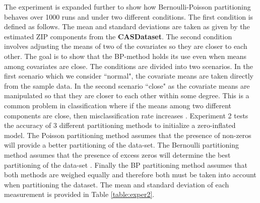 \documentclass[11pt,letterpaper]{article}
\numberwithin{equation}{section}
\numberwithin{equation}{section}
\numberwithin{equation}{section}
\begin{document}
The experiment is expanded further to show how Bernoulli-Poisson partitioning behaves over 1000 runs and under two different conditions. The first condition is defined as follows. The mean and standard deviations are taken as given by the estimated  ZIP components from the \textbf{CASDataset}. The second condition involves adjusting the means of two of the covariates so they are closer to each other. The goal is to show that the BP-method holds its use even when means among covariates are close. The conditions are divided into two scenarios. In the first scenario which we consider ``normal", the covariate means are taken directly from the sample data. In the second scenario ``close" as the covariate means are manipulated so that they are closer to each other within some degree. This is a common problem in classification where if the means among two different components are close, then misclassification rate increases \citep{LimHwa}. Experiment 2 tests the accuracy of 3 different partitioning methods to initialize a zero-inflated model. The Poisson partitioning method assumes that the presence of non-zeros will provide a better partitioning of the data-set. The Bernoulli partitioning method assumes that the presence of excess zeros will determine the best partitioning of the data-set . Finally the BP partitioning method assumes that both methods are weighed equally and therefore both must be taken into account when partitioning the dataset. The mean and standard deviation of each measurement is provided in Table \ref{table:exper2}.
\end{document}
